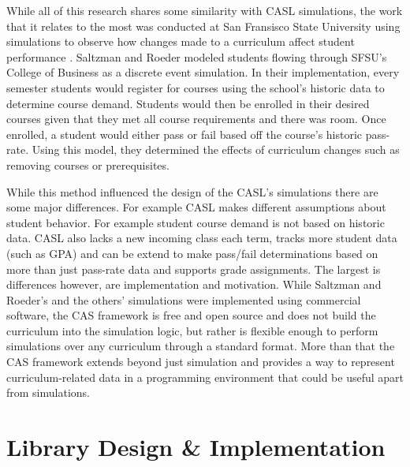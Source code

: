 \documentclass[botnum, fleqn]{unmeethesis}
\begin{document}
    While all of this research shares some similarity with CASL simulations, the work that it relates to the most was conducted at San Fransisco State University using simulations to observe how changes made to a curriculum affect student performance \cite{saltzman2012simulating}. Saltzman and Roeder modeled students flowing through SFSU's College of Business as a discrete event simulation. In their implementation, every semester students would register for courses using the school's historic data to determine course demand. Students would then be enrolled in their desired courses given that they met all course requirements and there was room. Once enrolled, a student would either pass or fail based off the course's historic pass-rate. Using this model, they determined the effects of curriculum changes such as removing courses or prerequisites. 

    While this method influenced the design of the CASL's simulations there are some major differences. For example CASL makes different assumptions about student behavior. For example student course demand is not based on historic data. CASL also lacks a new incoming class each term, tracks more student data (such as GPA) and can be extend to make pass/fail determinations based on more than just pass-rate data and supports grade assignments. The largest is differences however, are implementation and motivation. While Saltzman and Roeder's and the others' simulations were implemented using commercial software, the CAS framework is free and open source and does not build the curriculum into the simulation logic, but rather is flexible enough to perform simulations over any curriculum through a standard format. More than that the CAS framework extends beyond just simulation and provides a way to represent curriculum-related data in a programming environment that could be useful apart from simulations.

\chapter{Library Design \& Implementation}
\end{document}
